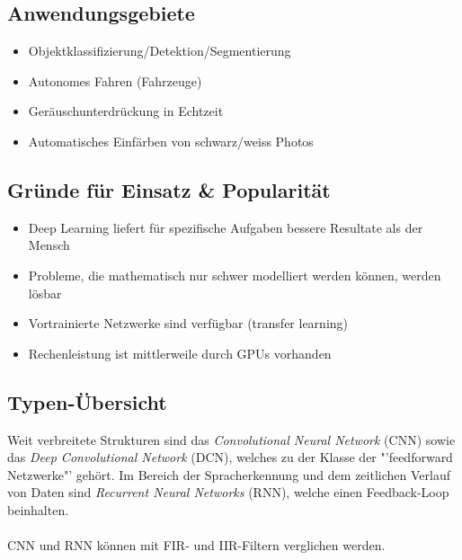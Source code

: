 \subsection{Anwendungsgebiete}
\begin{itemize}[noitemsep,topsep=3pt]
	\item Objektklassifizierung/Detektion/Segmentierung
	\item Autonomes Fahren (Fahrzeuge)
	\item Geräuschunterdrückung in Echtzeit
	\item Automatisches Einfärben von schwarz/weiss Photos
\end{itemize}
\subsection{Gründe für Einsatz \& Popularität}
\begin{itemize}[noitemsep,topsep=3pt]
	\item Deep Learning liefert für spezifische Aufgaben bessere Resultate als der Mensch
	\item Probleme, die mathematisch nur schwer modelliert werden können, werden lösbar
	\item Vortrainierte Netzwerke sind verfügbar (transfer learning)
	\item Rechenleistung ist mittlerweile durch GPUs vorhanden
\end{itemize}
\subsection{Typen-Übersicht}
Weit verbreitete Strukturen sind das \emph{Convolutional Neural Network} (CNN) sowie das 
\emph{Deep Convolutional Network} (DCN), welches zu der Klasse der "'feedforward Netzwerke"'
gehört. Im Bereich der Spracherkennung und dem zeitlichen Verlauf von Daten sind 
\emph{Recurrent Neural Networks} (RNN), welche einen Feedback-Loop beinhalten.\\\\
CNN und RNN können mit FIR- und IIR-Filtern verglichen werden.
\newpage
